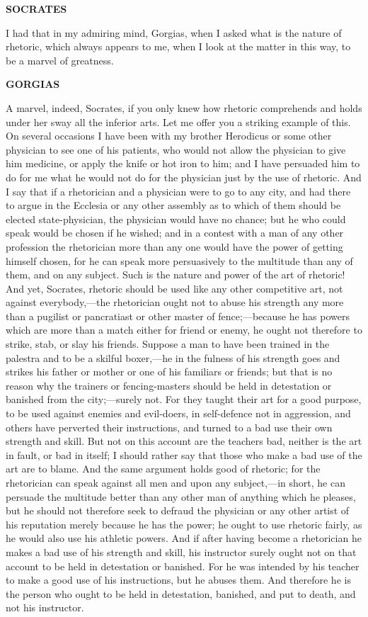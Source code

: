 \documentclass[11pt,letter]{article}
\begin{document}
\par \textbf{SOCRATES}
\par   I had that in my admiring mind, Gorgias, when I asked what is the nature of rhetoric, which always appears to me, when I look at the matter in this way, to be a marvel of greatness.

\par \textbf{GORGIAS}
\par   A marvel, indeed, Socrates, if you only knew how rhetoric comprehends and holds under her sway all the inferior arts. Let me offer you a striking example of this. On several occasions I have been with my brother Herodicus or some other physician to see one of his patients, who would not allow the physician to give him medicine, or apply the knife or hot iron to him; and I have persuaded him to do for me what he would not do for the physician just by the use of rhetoric. And I say that if a rhetorician and a physician were to go to any city, and had there to argue in the Ecclesia or any other assembly as to which of them should be elected state-physician, the physician would have no chance; but he who could speak would be chosen if he wished; and in a contest with a man of any other profession the rhetorician more than any one would have the power of getting himself chosen, for he can speak more persuasively to the multitude than any of them, and on any subject. Such is the nature and power of the art of rhetoric! And yet, Socrates, rhetoric should be used like any other competitive art, not against everybody,—the rhetorician ought not to abuse his strength any more than a pugilist or pancratiast or other master of fence;—because he has powers which are more than a match either for friend or enemy, he ought not therefore to strike, stab, or slay his friends. Suppose a man to have been trained in the palestra and to be a skilful boxer,—he in the fulness of his strength goes and strikes his father or mother or one of his familiars or friends; but that is no reason why the trainers or fencing-masters should be held in detestation or banished from the city;—surely not. For they taught their art for a good purpose, to be used against enemies and evil-doers, in self-defence not in aggression, and others have perverted their instructions, and turned to a bad use their own strength and skill. But not on this account are the teachers bad, neither is the art in fault, or bad in itself; I should rather say that those who make a bad use of the art are to blame. And the same argument holds good of rhetoric; for the rhetorician can speak against all men and upon any subject,—in short, he can persuade the multitude better than any other man of anything which he pleases, but he should not therefore seek to defraud the physician or any other artist of his reputation merely because he has the power; he ought to use rhetoric fairly, as he would also use his athletic powers. And if after having become a rhetorician he makes a bad use of his strength and skill, his instructor surely ought not on that account to be held in detestation or banished. For he was intended by his teacher to make a good use of his instructions, but he abuses them. And therefore he is the person who ought to be held in detestation, banished, and put to death, and not his instructor.
\end{document}
